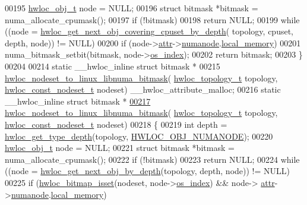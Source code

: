 \begin{DoxyCode}
00195   \hyperlink{a00238}{hwloc\_obj\_t} node = NULL;
00196   \textcolor{keyword}{struct }bitmask *bitmask = numa\_allocate\_cpumask();
00197   \textcolor{keywordflow}{if} (!bitmask)
00198     \textcolor{keywordflow}{return} NULL;
00199   \textcolor{keywordflow}{while} ((node = \hyperlink{a00196_gaba4b6d86eba1169ced4b0e941d2bb5f0}{hwloc\_get\_next\_obj\_covering\_cpuset\_by\_depth}(
      topology, cpuset, depth, node)) != NULL)
00200     \textcolor{keywordflow}{if} (node->\hyperlink{a00238_accd40e29f71f19e88db62ea3df02adc8}{attr}->\hyperlink{a00242_a6daa8729a68a637e6c80e94361314a87}{numanode}.\hyperlink{a00246_a6703cbf2afbf63c9d60c5ff4dc0c73aa}{local\_memory})
00201       numa\_bitmask\_setbit(bitmask, node->\hyperlink{a00238_a61a7a80a68eaccbaaa28269e678c81a9}{os\_index});
00202   \textcolor{keywordflow}{return} bitmask;
00203 \}
00204 
00214 \textcolor{keyword}{static} \_\_hwloc\_inline \textcolor{keyword}{struct }bitmask *
00215 \hyperlink{a00216_gadfaa14c1bec76965ac2e05f0c3f3473b}{hwloc\_nodeset\_to\_linux\_libnuma\_bitmask}(
      \hyperlink{a00186_ga9d1e76ee15a7dee158b786c30b6a6e38}{hwloc\_topology\_t} topology, \hyperlink{a00183_ga2f5276235841ad66a79bedad16a5a10c}{hwloc\_const\_nodeset\_t} nodeset) 
      \_\_hwloc\_attribute\_malloc;
00216 \textcolor{keyword}{static} \_\_hwloc\_inline \textcolor{keyword}{struct }bitmask *
\hyperlink{a00216_gadfaa14c1bec76965ac2e05f0c3f3473b}{00217} \hyperlink{a00216_gadfaa14c1bec76965ac2e05f0c3f3473b}{hwloc\_nodeset\_to\_linux\_libnuma\_bitmask}(
      \hyperlink{a00186_ga9d1e76ee15a7dee158b786c30b6a6e38}{hwloc\_topology\_t} topology, \hyperlink{a00183_ga2f5276235841ad66a79bedad16a5a10c}{hwloc\_const\_nodeset\_t} nodeset)
00218 \{
00219   \textcolor{keywordtype}{int} depth = \hyperlink{a00187_ga8bec782e21be313750da70cf7428b374}{hwloc\_get\_type\_depth}(topology, 
      \hyperlink{a00184_ggacd37bb612667dc437d66bfb175a8dc55a9d917a3e5497950c6d8948b8e183db5a}{HWLOC\_OBJ\_NUMANODE});
00220   \hyperlink{a00238}{hwloc\_obj\_t} node = NULL;
00221   \textcolor{keyword}{struct }bitmask *bitmask = numa\_allocate\_cpumask();
00222   \textcolor{keywordflow}{if} (!bitmask)
00223     \textcolor{keywordflow}{return} NULL;
00224   \textcolor{keywordflow}{while} ((node = \hyperlink{a00187_gac140a9b939d9fa0b30c4a910efcb0656}{hwloc\_get\_next\_obj\_by\_depth}(topology, depth, node)) != NULL)
00225     \textcolor{keywordflow}{if} (\hyperlink{a00205_ga11340dd487f110bb84f0a6e4ae90bd06}{hwloc\_bitmap\_isset}(nodeset, node->\hyperlink{a00238_a61a7a80a68eaccbaaa28269e678c81a9}{os\_index}) && node->
      \hyperlink{a00238_accd40e29f71f19e88db62ea3df02adc8}{attr}->\hyperlink{a00242_a6daa8729a68a637e6c80e94361314a87}{numanode}.\hyperlink{a00246_a6703cbf2afbf63c9d60c5ff4dc0c73aa}{local\_memory})

\end{DoxyCode}
